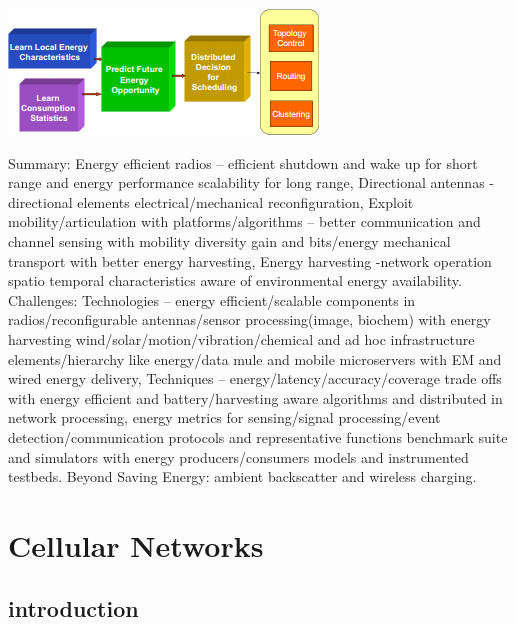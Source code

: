 \documentclass[9pt]{extarticle}
\begin{document}
\begin{multicols}{2}
\includegraphics{harvestingaware.png}

Summary: Energy efficient radios – efficient shutdown and wake up for short range and energy performance scalability for long range, Directional antennas - directional elements electrical/mechanical reconfiguration, Exploit mobility/articulation with platforms/algorithms – better communication and channel sensing with mobility diversity gain and bits/energy mechanical transport with better energy harvesting, Energy harvesting -network operation spatio temporal characteristics aware of environmental energy availability. Challenges: Technologies – energy efficient/scalable components in radios/reconfigurable antennas/sensor processing(image, biochem) with energy harvesting wind/solar/motion/vibration/chemical and ad hoc infrastructure elements/hierarchy like energy/data mule and mobile microservers with EM and wired energy delivery, Techniques – energy/latency/accuracy/coverage trade offs with energy efficient and battery/harvesting aware algorithms and distributed in network processing, energy metrics for sensing/signal processing/event detection/communication protocols and representative functions benchmark suite and simulators with energy producers/consumers models and instrumented testbeds. Beyond Saving Energy: ambient backscatter and wireless charging.

\section{Cellular Networks}

\subsection{introduction}


\end{multicols}
\end{document}
